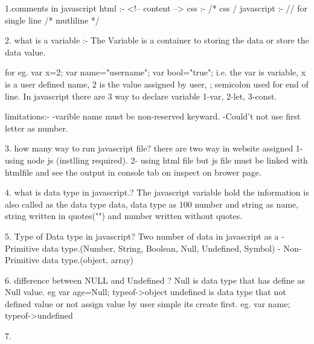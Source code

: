 1.comments in javascript
    html       :- <!--  content  -->
    css        :- /* css /
    javascript :- // for single line
                    /* mutliline */

2. what is a variable :-
                The Variable is a container to storing the data or store the data value.
                
                for eg. var x=2;    var name="username";    var bool="true";
                    i.e. the var is variable, x is a user defined name, 2 is the value assigned by user, ; semicolon used for end of line.
                In javascript there are 3 way to declare variable 1-var, 2-let, 3-const.

            limitations:- 
                -varible name must be non-reserved keyward.
                -Could't not use first letter as number.
            
3. how many way to run javascript file?
    there are two way in website assigned   
        1- using node js (instlling required).
        2- using html file but js file must be linked with htmlfile and see the output in console tab on inspect on brower page.

4. what is data type in javascript.?
    The javascript variable hold the information is also called as the data type data,
    data type  as 100 number and string as name,  string written in quotes("") and number written without quotes. 
    
5. Type of Data type in javascript?
    Two number of data in javascript as a
        - Primitive data type.(Number, String, Boolean, Null, Undefined, Symbol)
        - Non-Primitive data type.(object, array)

6. difference between NULL and Undefined ?
    Null is data type that has define as Null value.
    eg var age=Null;  typeof->object
    undefined is data type that not defined value or not assign value by user simple its create first.  
    eg. var name;  typeof->undefined       

7.  